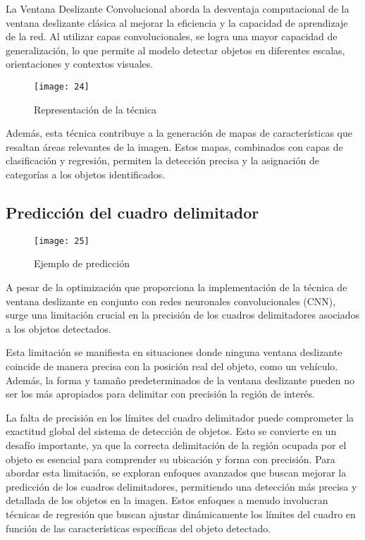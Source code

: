 	La Ventana Deslizante Convolucional aborda la desventaja computacional de la ventana deslizante clásica al mejorar la eficiencia y la capacidad de aprendizaje de la red. Al utilizar capas convolucionales, se logra una mayor capacidad de generalización, lo que permite al modelo detectar objetos en diferentes escalas, orientaciones y contextos visuales.
	
	\begin{figure}[ht]
	    \centering
		\texttt{[image: 24]}
		\caption{Representación de la técnica}
	\end{figure}
	
	Además, esta técnica contribuye a la generación de mapas de características que resaltan áreas relevantes de la imagen. Estos mapas, combinados con capas de clasificación y regresión, permiten la detección precisa y la asignación de categorías a los objetos identificados.

	\subsection{Predicción del cuadro delimitador}
	
	\begin{wrapfigure}[22]{R}{.43\textwidth} 
		\centering
		\texttt{[image: 25]}
		\caption{Ejemplo de predicción}
	\end{wrapfigure}
	
	A pesar de la optimización que proporciona la implementación de la técnica de ventana deslizante en conjunto con redes neuronales convolucionales (CNN), surge una limitación crucial en la precisión de los cuadros delimitadores asociados a los objetos detectados.

	Esta limitación se manifiesta en situaciones donde ninguna ventana deslizante coincide de manera precisa con la posición real del objeto, como un vehículo. Además, la forma y tamaño predeterminados de la ventana deslizante pueden no ser los más apropiados para delimitar con precisión la región de interés.
	
	La falta de precisión en los límites del cuadro delimitador puede comprometer la exactitud global del sistema de detección de objetos. Esto se convierte en un desafío importante, ya que la correcta delimitación de la región ocupada por el objeto es esencial para comprender su ubicación y forma con precisión.
	Para abordar esta limitación, se exploran enfoques avanzados que buscan mejorar la predicción de los cuadros delimitadores, permitiendo una detección más precisa y detallada de los objetos en la imagen. Estos enfoques a menudo involucran técnicas de regresión que buscan ajustar dinámicamente los límites del cuadro en función de las características específicas del objeto detectado.

